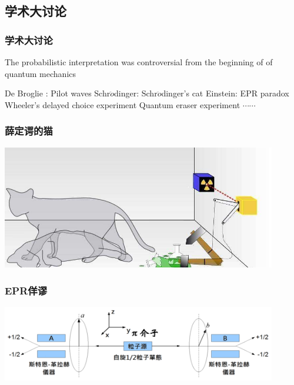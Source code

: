 \subsection{学术大讨论}
\begin{frame}
    \frametitle{学术大讨论}
    The probabilistic interpretation was controversial from the beginning of of quantum mechanics
    \begin{tcolorbox4}
    \begin{itemize}
        \Item De Broglie : Pilot waves
        \Item Schr$\ddot{o}$dinger: Schr$\ddot{o}$dinger's cat
        \Item Einstein: EPR paradox
        \Item Wheeler's delayed choice experiment
        \Item Quantum eraser experiment
        \Item $\cdots \cdots$
    \end{itemize}
    \end{tcolorbox4}
\end{frame}

\begin{frame}
    \frametitle{薛定谔的猫}
    \begin{center}
        \includegraphics[width=0.9\textwidth]{figs/2022-03-04-13-49-09.png} \\
    \end{center} 
\end{frame}

\begin{frame}
    \frametitle{EPR佯谬}
    \begin{center}
        \includegraphics[width=0.9\textwidth]{figs/28.png} \\
    \end{center} 
\end{frame}

